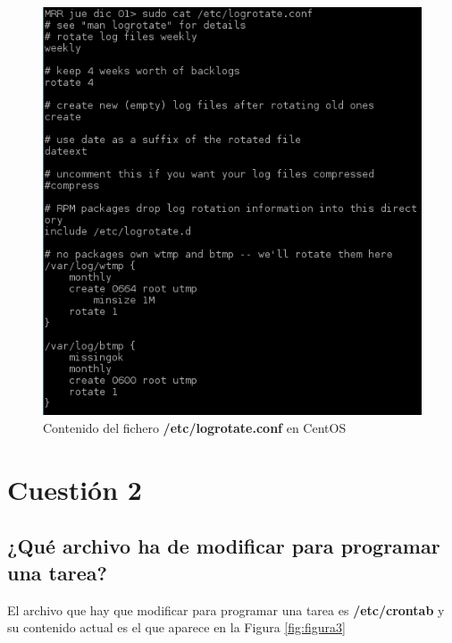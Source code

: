 \begin{figure}[H] %
	\centering
	\includegraphics[scale=0.9]{figuras/figura2.png} 
	\caption{Contenido del fichero \textbf{/etc/logrotate.conf} en CentOS} 
	\label{fig:figura2}
\end{figure}

\newpage


\section{Cuestión 2}
\subsection{¿Qué archivo ha de modificar para programar una tarea?}

El archivo que hay que modificar para programar una tarea es \textbf{/etc/crontab} \cite{enlace3} y su contenido actual es el que aparece en la Figura \ref{fig:figura3}


